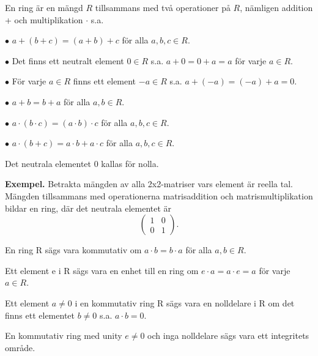 \begin{definition}
En ring är en mängd $R$ tillsammans med två operationer på $R$, nämligen addition + och multiplikation $\cdot$ s.a.

$\bullet$ $a+(b+c) = (a+b)+c$ för alla $a,b,c \in R$.

$\bullet$ Det finns ett neutralt element $0 \in R$ s.a. $a+0=0+a=a$ för varje $a \in R$.

$\bullet$ För varje $a \in R$ finns ett element $-a \in R$ s.a. $a + (-a) = (-a) + a = 0$.

$\bullet$ $a + b = b + a$ för alla $a,b \in R$.

$\bullet$ $a \cdot (b \cdot c)=(a \cdot b) \cdot c$ för alla $a,b,c \in R$.

$\bullet$ $a \cdot (b + c) = a \cdot b + a \cdot c$ för alla $a,b,c \in R$.

\noindent
Det neutrala elementet $0$ kallas för nolla.

\end{definition}

\noindent\textbf{Exempel.} Betrakta mängden av alla 2x2-matriser vars element är reella tal. Mängden tillsammans
med operationerna matrisaddition och matrismultiplikation bildar en ring, där det neutrala elementet är
\begin{equation*}
  \begin{pmatrix}
  1 & 0 \\
  0 & 1
  \end{pmatrix}.
\end{equation*}

\begin{definition}
 En ring R sägs vara kommutativ om $a \cdot b = b \cdot a$ för alla $a,b \in R$.
\end{definition}

\begin{definition}
 Ett element e i R sägs vara en enhet till en ring om $e \cdot a = a \cdot e = a$ för varje $a \in R$.
\end{definition}

\begin{definition}
 Ett element $a \neq 0$ i en kommutativ ring R sägs vara en nolldelare i R om det finns ett elementet
$b \neq 0$ s.a. $a \cdot b = 0$.
\end{definition}

\begin{definition}
 En kommutativ ring med unity $e \neq 0$ och inga nolldelare sägs vara ett integritets område.
\end{definition}

